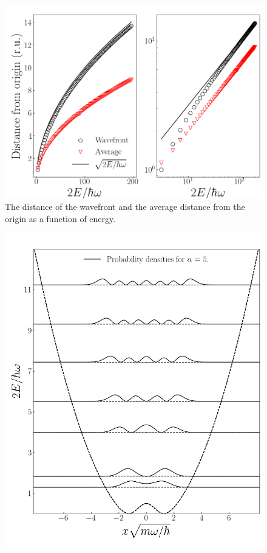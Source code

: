 \documentclass[twocolumn]{article}
\begin{document}
\begin{large}
\begin{figure}[t!]
    \centering
    \includegraphics[scale=0.35]{dist.png}
    \caption{The distance of the wavefront and the average distance from the origin as a function of energy.}
    \label{4apr1941}
\end{figure}
\begin{figure}[b!]
    \centering
    \includegraphics[scale=0.37]{alpha5_density.png}

\end{figure}
\end{large}
\end{document}
